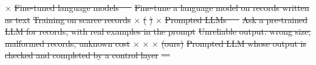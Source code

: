 \documentclass[conference]{IEEEtran}
\newcommand{\system}{\textsc{Synthagent}\xspace}
\providecommand{\DIFdeltex}[1]{{\protect\color{red}\sout{#1}}}                      %
\providecommand{\DIFdelFL}[1]{\DIFdel{#1}} %
\providecommand{\DIFdel}[1]{\texorpdfstring{\DIFdeltex{#1}}{}} %
\begin{document}
\DIFdelFL{$\times$ }%
\DIFdelFL{Fine-tuned language models~\mbox{%
\cite{borisov2023great,solatorio2023realtabformer} }\hskip0pt%
}%
\DIFdelFL{Fine-tune a language model on records written as text }%
\DIFdelFL{Training on scarce records }%
\DIFdelFL{$\times$ }%
\DIFdelFL{(}%
\DIFdelFL{) }%
\DIFdelFL{$\times$ }%
\DIFdelFL{Prompted LLMs~\mbox{%
\cite{seedat2024cllm,kim2024epic} }\hskip0pt%
}%
\DIFdelFL{Ask a pre-trained LLM for records, with real examples in the prompt }%
\DIFdelFL{Unreliable output: wrong size, malformed records, unknown cost }%
\DIFdelFL{$\times$ }%
\DIFdelFL{$\times$ }%
\DIFdelFL{$\times$ }%
\DIFdelFL{(ours) }%
\DIFdelFL{Prompted LLM whose output is checked and completed by a control layer }%
\DIFdelFL{--- }%
\end{document}
